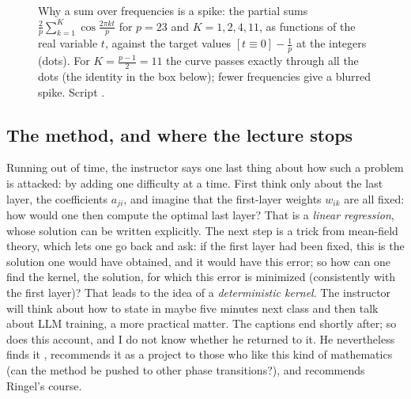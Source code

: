 \begin{figure}[tb]
\centering
{}
\caption{Why a sum over frequencies is a spike: the partial sums $\frac2p\sum_{k=1}^K\cos\frac{2\pi kt}p$ for $p=23$ and $K=1,2,4,11$, as functions of the real variable $t$, against the target values $[t\equiv0]-\frac1p$ at the integers (dots). For $K=\frac{p-1}2=11$ the curve passes exactly through all the dots (the identity in the box below); fewer frequencies give a blurred spike. Script .}
\label{fig:L5-fourier}
\end{figure}

\subsection{The method, and where the lecture stops}\label{sec:L5-method}
Running out of time, the instructor says one last thing about how such a problem is attacked: by adding one difficulty at a time. First think only about the last layer, the coefficients $a_{ji}$, and imagine that the first-layer weights $w_{ik}$ are all fixed: how would one then compute the optimal last layer? That is a \emph{linear regression}, whose solution can be written explicitly. The next step is a trick from mean-field theory, which lets one go back and ask: if the first layer had been fixed, this is the solution one would have obtained, and it would have this error; so how can one find the kernel, the solution, for which this error is minimized (consistently with the first layer)? That leads to the idea of a \emph{deterministic kernel}. The instructor will think about how to state  in maybe five minutes next class and then talk about LLM training, a more practical matter. The captions end shortly after; so does this account, and I do not know whether he returned to it. He nevertheless finds it , recommends it as a project to those who like this kind of mathematics (can the method be pushed to other phase transitions?), and recommends Ringel's course.

